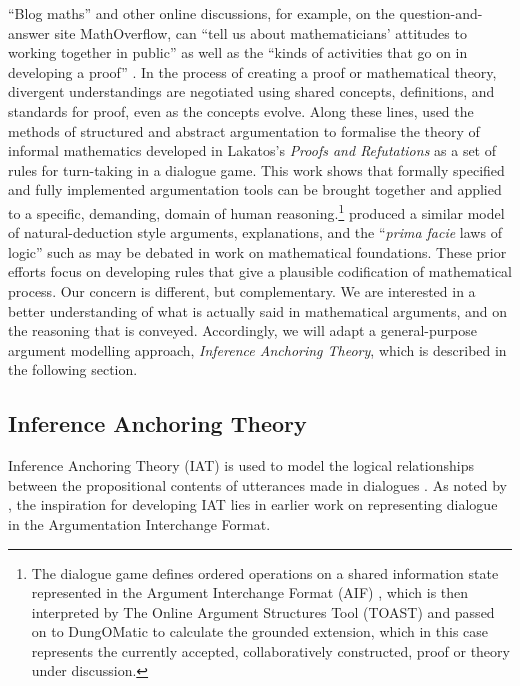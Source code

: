 \documentclass[smallextended,oneside]{svjour3}       %
\newcounter{turn}
\let\cite\citep
\newcommand\nothing[1]{#1}
\let\thesis\nothing
\begin{document}
``Blog maths'' \cite{barany2010b} and other online discussions,
for example, on the
question-and-answer site MathOverflow, can ``tell us
about mathematicians' attitudes to working together in public'' as
well as the ``kinds of activities that go on in developing a proof''
\cite{Martin2015}.
In the process of creating a proof or mathematical theory, divergent
understandings are negotiated using shared concepts, definitions, and
standards for proof, even as the concepts evolve.  Along these lines,
\citet{lak} used the methods of structured and abstract argumentation
to formalise the theory of informal mathematics developed in
Lakatos's \emph{Proofs and Refutations}
\citeyearpar{lakatos2015proofs} as a set of rules for turn-taking in a
dialogue game.  This work shows that formally specified and fully
implemented argumentation tools can be brought together and applied to
a specific, demanding, domain of human reasoning.\footnote{\label{fn:technical-details}The
  dialogue game defines ordered operations on a shared information state
  represented in the Argument Interchange Format (AIF)
  \cite{lawrence2012aifdb}, which is then interpreted by The Online
  Argument Structures Tool (TOAST) \cite{Snaith2012} and passed on to
  DungOMatic \cite{snaith2010pipelining} to calculate the grounded
  extension, which in this case represents the currently accepted,
  collaboratively constructed, proof or theory under discussion.}
\citet{dauphin2018aspicend} produced a similar model of
natural-deduction style arguments, explanations,
and the ``\emph{prima facie} laws of logic'' such as may be debated in
work on mathematical foundations.
These prior efforts focus on developing rules that give a plausible codification
of mathematical process.  Our concern is different,
but complementary.  We are interested in a better
understanding of what is actually said in mathematical arguments, and on
the reasoning that is conveyed.
Accordingly, we will adapt a general-purpose argument modelling
approach, \emph{Inference Anchoring Theory}, which is described in the
following section.

\subsection{Inference Anchoring Theory} \label{iat}

\thesis{Inference Anchoring Theory (IAT) is used to model the logical
  relationships between the propositional contents of 
  utterances made in dialogues \cite{budzynska2011speech}.}  As noted
by \citet{Reed2017}, the inspiration for developing IAT lies in
earlier work on representing dialogue in the Argumentation Interchange
Format.
\end{document}

